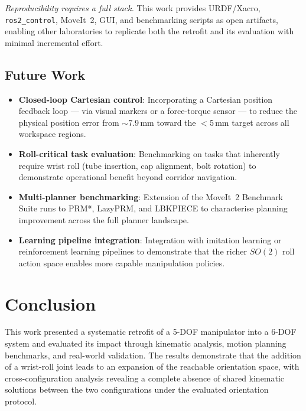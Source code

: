 \documentclass[conference]{IEEEtran}
\begin{document}
	\textit{Reproducibility requires a full stack.}
	This work provides URDF/Xacro, \texttt{ros2\_control}, MoveIt~2, GUI,
	and benchmarking scripts as open artifacts, enabling other laboratories
	to replicate both the retrofit and its evaluation with minimal
	incremental effort.
	
	\subsection{Future Work}
	
	\begin{itemize}
		\item \textbf{Closed-loop Cartesian control}: Incorporating a
		Cartesian position feedback loop --- via visual markers or a
		force-torque sensor --- to reduce the physical position error
		from $\sim$7.9\,mm toward the $<$5\,mm target across all
		workspace regions.
		
		\item \textbf{Roll-critical task evaluation}: Benchmarking on
		tasks that inherently require wrist roll (tube insertion, cap
		alignment, bolt rotation) to demonstrate operational benefit
		beyond corridor navigation.
		
		\item \textbf{Multi-planner benchmarking}: Extension of the
		MoveIt~2 Benchmark Suite runs to PRM*, LazyPRM, and LBKPIECE
		to characterise planning improvement across the full planner
		landscape.
		
		\item \textbf{Learning pipeline integration}: Integration with
		imitation learning or reinforcement learning pipelines to
		demonstrate that the richer $SO(2)$ roll action space enables
		more capable manipulation policies.
		
	\end{itemize}
	
	
	\section{Conclusion}
	\label{sec:conclusion}
	
	This work presented a systematic retrofit of a 5-DOF manipulator into
	a 6-DOF system and evaluated its impact through kinematic analysis,
	motion planning benchmarks, and real-world validation. The results
	demonstrate that the addition of a wrist-roll joint leads to an
	expansion of the reachable orientation space, with cross-configuration
	analysis revealing a complete absence of shared kinematic solutions
	between the two configurations under the evaluated orientation protocol.
	
\end{document}
